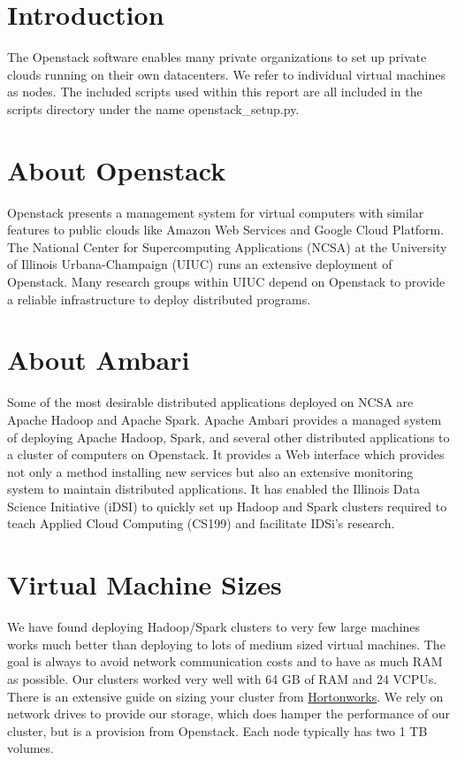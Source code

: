 \documentclass[9pt,twocolumn,twoside]{idsi}
\begin{document}
\makecoverpage

\maketitle

\section{Introduction}
The Openstack software enables many private organizations to set up private clouds running on their own datacenters. We refer to individual virtual machines as nodes. The included scripts used within this report are all included in the scripts directory under the name openstack\_setup.py. 

\section{About Openstack}
Openstack presents a management system for virtual computers with similar features to public clouds like Amazon Web Services and Google Cloud Platform. The National Center for Supercomputing Applications (NCSA) at the University of Illinois Urbana-Champaign (UIUC) runs an extensive deployment of Openstack. Many research groups within UIUC depend on Openstack to provide a reliable infrastructure to deploy distributed programs.

\section{About Ambari}
Some of the most desirable distributed applications deployed on NCSA are Apache Hadoop and Apache Spark. Apache Ambari provides a managed system of deploying Apache Hadoop, Spark, and several other distributed applications to a cluster of computers on Openstack. It provides a Web interface which provides not only a method installing new services but also an extensive monitoring system to maintain distributed applications. It has enabled the Illinois Data Science Initiative (iDSI) to quickly set up Hadoop and Spark clusters required to teach Applied Cloud Computing (CS199) and facilitate IDSi’s research.

\section{Virtual Machine Sizes}
We have found deploying Hadoop/Spark clusters to very few large machines works much better than deploying to lots of medium sized virtual machines. The goal is always to avoid network communication costs and to have as much RAM as possible. Our clusters worked very well with 64 GB of RAM and 24 VCPUs. There is an extensive guide on sizing your cluster from \href{https://docs.hortonworks.com/HDPDocuments/HDP2/HDP-2.3.0/bk_cluster-planning-guide/bk_cluster-planning-guide-20150721.pdf}{Hortonworks}. We rely on network drives to provide our storage, which does hamper the performance of our cluster, but is a provision from Openstack. Each node typically has two 1 TB volumes.
\end{document}
